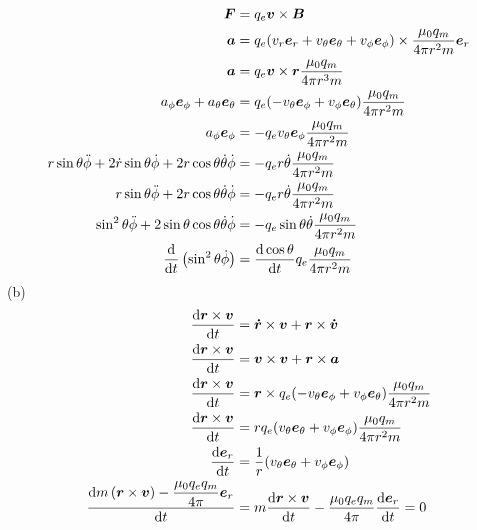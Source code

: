 \begin{align*}
\boldsymbol{F}&=q_e\boldsymbol{v}\times\boldsymbol{B}\\
\boldsymbol{a}&=q_e(v_r\boldsymbol{e}_r
+v_\theta\boldsymbol{e}_\theta
+v_\phi\boldsymbol{e}_\phi)\times\dfrac{\mu_0q_m}{4\pi r^2m}\boldsymbol{e}_r\\
\boldsymbol{a}&=q_e\boldsymbol{v}\times\boldsymbol{r}\dfrac{\mu_0q_m}{4\pi r^3m}\\
a_\phi\boldsymbol{e}_\phi
+a_\theta\boldsymbol{e}_\theta&=q_e(-v_\theta\boldsymbol{e}_\phi
+v_\phi\boldsymbol{e}_\theta)\dfrac{\mu_0q_m}{4\pi r^2m}\\
a_\phi\boldsymbol{e}_\phi
&=-q_ev_\theta\boldsymbol{e}_\phi
\dfrac{\mu_0q_m}{4\pi r^2m}\\
r\sin\theta\ddot\phi
+2\dot r\sin\theta\dot \phi
+2r\cos\theta\dot\theta\dot\phi
&=-q_er\dot\theta
\dfrac{\mu_0q_m}{4\pi r^2m}\\
r\sin\theta\ddot\phi
+2r\cos\theta\dot\theta\dot\phi
&=-q_er\dot\theta
\dfrac{\mu_0q_m}{4\pi r^2m}\\
\sin^2\theta\ddot\phi
+2\sin\theta\cos\theta\dot\theta\dot\phi
&=-q_e\sin\theta\dot\theta
\dfrac{\mu_0q_m}{4\pi r^2m}\\
\frac{\dif}{\dif t}\left(\sin^2\theta\dot\phi\right)
&=\frac{\dif\cos\theta}{\dif t}q_e
\dfrac{\mu_0q_m}{4\pi r^2m}
\end{align*}
(b)
\begin{align*}
\frac{\dif \boldsymbol{r}\times\boldsymbol{v}}{\dif t}&=\boldsymbol{\dot r}\times\boldsymbol{v}
+\boldsymbol{r}\times\boldsymbol{\dot v}\\
\frac{\dif \boldsymbol{r}\times\boldsymbol{v}}{\dif t}&=\boldsymbol{v}\times\boldsymbol{v}
+\boldsymbol{r}\times\boldsymbol{a}\\
\frac{\dif \boldsymbol{r}\times\boldsymbol{v}}{\dif t}&=\boldsymbol{r}\times q_e(-v_\theta\boldsymbol{e}_\phi
+v_\phi\boldsymbol{e}_\theta)\dfrac{\mu_0q_m}{4\pi r^2m}\\
\frac{\dif \boldsymbol{r}\times\boldsymbol{v}}{\dif t}&=rq_e(v_\theta\boldsymbol{e}_\theta
+v_\phi\boldsymbol{e}_\phi)\dfrac{\mu_0q_m}{4\pi r^2m}\\
\frac{\dif \boldsymbol{e}_r}{\dif t}&=\frac{1}{r}(v_\theta\boldsymbol{e}_\theta
+v_\phi\boldsymbol{e}_\phi)\\
\frac{\dif m\left(\boldsymbol{r}\times\boldsymbol{v}\right)-\dfrac{\mu_0q_eq_m}{4\pi}\boldsymbol{e}_r}{\dif t}&=m\frac{\dif \boldsymbol{r}\times\boldsymbol{v}}{\dif t}
-\dfrac{\mu_0q_eq_m}{4\pi}\frac{\dif \boldsymbol{e}_r}{\dif t}=0
\end{align*}
